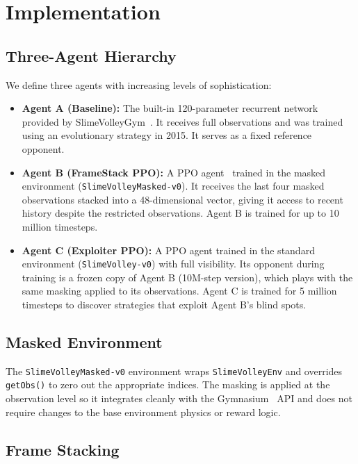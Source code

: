 \documentclass[conference]{IEEEtran}
\begin{document}
\section{Implementation}

\subsection{Three-Agent Hierarchy}

We define three agents with increasing levels of sophistication:

\begin{itemize}
    \item \textbf{Agent A (Baseline):} The built-in 120-parameter recurrent network provided by SlimeVolleyGym~\cite{slimevolleygym}. It receives full observations and was trained using an evolutionary strategy in 2015. It serves as a fixed reference opponent.
    \item \textbf{Agent B (FrameStack PPO):} A PPO agent~\cite{schulman2017proximal} trained in the masked environment (\texttt{SlimeVolleyMasked-v0}). It receives the last four masked observations stacked into a 48-dimensional vector, giving it access to recent history despite the restricted observations. Agent B is trained for up to 10 million timesteps.
    \item \textbf{Agent C (Exploiter PPO):} A PPO agent trained in the standard environment (\texttt{SlimeVolley-v0}) with full visibility. Its opponent during training is a frozen copy of Agent B (10M-step version), which plays with the same masking applied to its observations. Agent C is trained for 5 million timesteps to discover strategies that exploit Agent B's blind spots.
\end{itemize}

\subsection{Masked Environment}

The \texttt{SlimeVolleyMasked-v0} environment wraps \texttt{SlimeVolleyEnv} and overrides \texttt{getObs()} to zero out the appropriate indices. The masking is applied at the observation level so it integrates cleanly with the Gymnasium~\cite{gymnasium} API and does not require changes to the base environment physics or reward logic.

\subsection{Frame Stacking}
\end{document}
